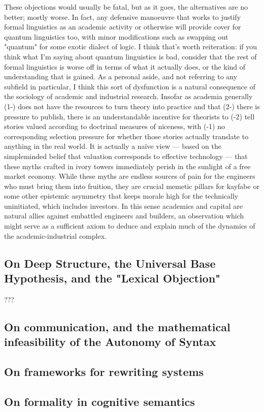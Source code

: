 These objections would usually be fatal, but as it goes, the alternatives are no better; mostly worse. In fact, any defensive manoeuvre that works to justify formal linguistics as an academic activity or otherwise will provide cover for quantum linguistics too, with minor modifications such as swapping out "quantum" for some exotic dialect of logic. I think that's worth reiteration: if you think what I'm saying about quantum linguistics is bad, consider that the rest of formal linguistics is worse off in terms of what it actually does, or the kind of understanding that is gained. As a personal aside, and not referring to any subfield in particular, I think this sort of dysfunction is a natural consequence of the sociology of academic and industrial research. Insofar as academia generally (1-) does not have the resources to turn theory into practice and that (2-) there is pressure to publish, there is an understandable incentive for theorists to (-2) tell stories valued according to doctrinal measures of niceness, with (-1) no corresponding selection pressure for whether those stories actually translate to anything in the real world. It is actually a na\"{i}ve view --- based on the simpleminded belief that valuation corresponds to effective technology --- that these myths crafted in ivory towers immediately perish in the sunlight of a free market economy. While these myths are endless sources of pain for the engineers who must bring them into fruition, they are crucial memetic pillars for kayfabe or some other epistemic asymmetry that keeps morale high for the technically uninitiated, which includes investors. In this sense academics and capital are natural allies against embattled engineers and builders, an observation which might serve as a sufficient axiom to deduce and explain much of the dynamics of the academic-industrial complex.

\subsection{On Deep Structure, the Universal Base Hypothesis, and the "Lexical Objection"}

???

\subsection{On communication, and the mathematical infeasibility of the Autonomy of Syntax}

\subsection{On frameworks for rewriting systems}

\subsection{On formality in cognitive semantics}